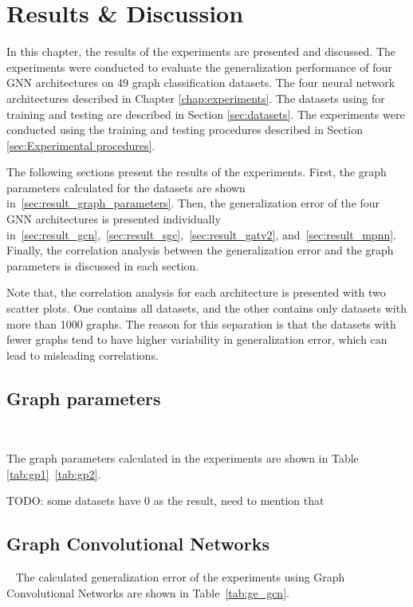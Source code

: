 \chapter{Results \& Discussion}\label{chap:results}

In this chapter, the results of the experiments are presented and discussed. The experiments were conducted to evaluate the generalization performance of four GNN architectures on 49 graph classification datasets. The four neural network architectures described in Chapter \ref{chap:experiments}. The datasets using for training and testing are described in Section \ref{sec:datasets}. The experiments were conducted using the training and testing procedures described in Section \ref{sec:Experimental procedures}.

The following sections present the results of the experiments. First, the graph parameters calculated for the datasets are shown in~\ref{sec:result_graph_parameters}. Then, the generalization error of the four GNN architectures is presented individually in~\ref{sec:result_gcn},~\ref{sec:result_sgc},~\ref{sec:result_gatv2}, and~\ref{sec:result_mpnn}. Finally, the correlation analysis between the generalization error and the graph parameters is discussed in each section.

Note that, the correlation analysis for each architecture is presented with two scatter plots. One contains all datasets, and the other contains only datasets with more than 1000 graphs. The reason for this separation is that the datasets with fewer graphs tend to have higher variability in generalization error, which can lead to misleading correlations.

\section{Graph parameters}~\label{sec:result_graph_parameters}

The graph parameters calculated in the experiments are shown in Table \ref{tab:gp1}~\ref{tab:gp2}. 

TODO: some datasets have 0 as the result, need to mention that

\section{Graph Convolutional Networks}~\label{sec:result_gcn}
The calculated generalization error of the experiments using Graph Convolutional Networks are shown in Table~\ref{tab:ge_gcn}.


